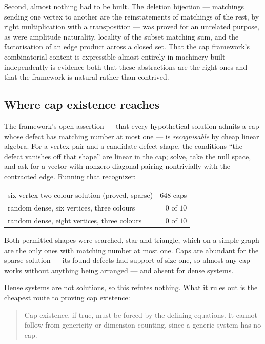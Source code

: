 \documentclass[11pt]{article}
\theoremstyle{definition}
\theoremstyle{remark}
\begin{document}
Second, almost nothing had to be built. The deletion bijection --- matchings sending
one vertex to another are the reinstatements of matchings of the rest, by right
multiplication with a transposition --- was proved for an unrelated purpose, as were
amplitude naturality, locality of the subset matching sum, and the factorisation of an
edge product across a closed set. That the cap framework's combinatorial content is
expressible almost entirely in machinery built independently is evidence both that
these abstractions are the right ones and that the framework is natural rather than
contrived.

\subsection{Where cap existence reaches}

The framework's open assertion --- that every hypothetical solution admits a cap
whose defect has matching number at most one --- is \emph{recognisable} by cheap
linear algebra. For a vertex pair and a candidate defect shape, the conditions
``the defect vanishes off that shape'' are linear in the cap; solve, take the null
space, and ask for a vector with nonzero diagonal pairing nontrivially with the
contracted edge. Running that recognizer:

\begin{center}
\begin{tabular}{lr}
\hline
six-vertex two-colour solution (proved, sparse) & $648$ caps\\
random dense, six vertices, three colours & $0$ of $10$\\
random dense, eight vertices, three colours & $0$ of $10$\\
\hline
\end{tabular}
\end{center}

Both permitted shapes were searched, star and triangle, which on a simple graph are
the only ones with matching number at most one. Caps are abundant for the sparse
solution --- its found defects had support of size one, so almost any cap works
without anything being arranged --- and absent for dense systems.

Dense systems are not solutions, so this refutes nothing. What it rules out is the
cheapest route to proving cap existence:

\begin{quote}
Cap existence, if true, must be forced by the defining equations. It cannot follow
from genericity or dimension counting, since a generic system has no cap.
\end{quote}
\end{document}
